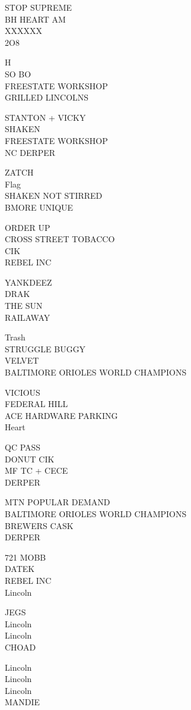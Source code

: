 \documentclass[10pt,letterpaper]{article}
\begin{document}
STOP SUPREME\\
BH HEART AM\\
XXXXXX\\
2O8

H\\
SO BO\\
FREESTATE WORKSHOP\\
GRILLED LINCOLNS

STANTON + VICKY\\
SHAKEN\\
FREESTATE WORKSHOP\\
NC DERPER

ZATCH\\
Flag\\
SHAKEN NOT STIRRED\\
BMORE UNIQUE

ORDER UP\\
CROSS STREET TOBACCO\\
CIK\\
REBEL INC

YANKDEEZ\\
DRAK\\
THE SUN\\
RAILAWAY

Trash\\
STRUGGLE BUGGY\\
VELVET\\
BALTIMORE ORIOLES WORLD CHAMPIONS

VICIOUS\\
FEDERAL HILL\\
ACE HARDWARE PARKING\\
Heart

QC PASS\\
DONUT CIK\\
MF TC + CECE\\
DERPER

MTN POPULAR DEMAND\\
BALTIMORE ORIOLES WORLD CHAMPIONS\\
BREWERS CASK\\
DERPER

721 MOBB\\
DATEK\\
REBEL INC\\
Lincoln

JEGS\\
Lincoln\\
Lincoln\\
CHOAD

Lincoln\\
Lincoln\\
Lincoln\\
MANDIE
\end{document}
